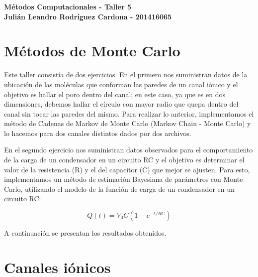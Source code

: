\documentclass[12pt,letterpaper]{article}
\begin{document}
\begin{center}
{\Large \textbf{Métodos Computacionales - Taller 5}}\\
\vspace{0.3cm}
\textbf{Julián Leandro Rodríguez Cardona - 201416065}\\ \vspace{0.3cm}
\end{center}

\section*{Métodos de Monte Carlo}

Este taller consistía de dos ejercicios. En el primero nos suministran datos de la ubicación de las moléculas que conforman las paredes de un canal iónico y el objetivo es hallar el poro dentro del canal; en este caso, ya que es en dos dimensiones, debemos hallar el círculo con mayor radio que quepa dentro del canal sin tocar las paredes del mismo. Para realizar lo anterior, implementamos el método de Cadenas de Markov de Monte Carlo (Markov Chain - Monte Carlo) y lo hacemos para dos canales distintos dados por dos archivos.

En el segundo ejercicio nos suministran datos observados para el comportamiento de la carga de un condensador en un circuito RC y el objetivo es determinar el valor de la resistencia (R) y el del capacitor (C) que mejor se ajusten. Para esto, implementamos un método de estimación Bayesiana de parámetros con Monte Carlo, utilizando el modelo de la función de carga de un condensador en un circuito RC:

$$ Q(t) = V_0 C \left( 1- e^{-t/RC} \right) $$

A continuación se presentan los resultados obtenidos.

\section{Canales iónicos}
\end{document}
